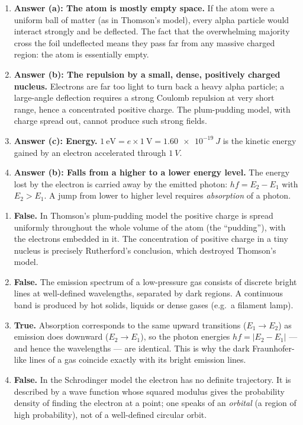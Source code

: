 \documentclass[11pt]{article}
\begin{document}
\begin{corrige}
\begin{enumerate}
\item \textbf{Answer (a): The atom is mostly empty space.} If the atom were a uniform ball of matter (as in Thomson's model), every alpha particle would interact strongly and be deflected. The fact that the overwhelming majority cross the foil undeflected means they pass far from any massive charged region: the atom is essentially empty.
\item \textbf{Answer (b): The repulsion by a small, dense, positively charged nucleus.} Electrons are far too light to turn back a heavy alpha particle; a large-angle deflection requires a strong Coulomb repulsion at very short range, hence a concentrated positive charge. The plum-pudding model, with charge spread out, cannot produce such strong fields.
\item \textbf{Answer (c): Energy.} $1\ \mathrm{eV} = e \times 1\ \mathrm{V} = \SI{1.60e-19}{J}$ is the kinetic energy gained by an electron accelerated through $\SI{1}{V}$.
\item \textbf{Answer (b): Falls from a higher to a lower energy level.} The energy lost by the electron is carried away by the emitted photon: $hf = E_2 - E_1$ with $E_2 > E_1$. A jump from lower to higher level requires \emph{absorption} of a photon.
\end{enumerate}
\end{corrige}

\begin{corrige}
\begin{enumerate}
\item \textbf{False.} In Thomson's plum-pudding model the positive charge is spread uniformly throughout the whole volume of the atom (the ``pudding''), with the electrons embedded in it. The concentration of positive charge in a tiny nucleus is precisely Rutherford's conclusion, which destroyed Thomson's model.
\item \textbf{False.} The emission spectrum of a low-pressure gas consists of discrete bright lines at well-defined wavelengths, separated by dark regions. A continuous band is produced by hot solids, liquids or dense gases (e.g.\ a filament lamp).
\item \textbf{True.} Absorption corresponds to the same upward transitions ($E_1 \to E_2$) as emission does downward ($E_2 \to E_1$), so the photon energies $hf = |E_2 - E_1|$ — and hence the wavelengths — are identical. This is why the dark Fraunhofer-like lines of a gas coincide exactly with its bright emission lines.
\item \textbf{False.} In the Schrodinger model the electron has no definite trajectory. It is described by a wave function whose squared modulus gives the probability density of finding the electron at a point; one speaks of an \emph{orbital} (a region of high probability), not of a well-defined circular orbit.
\end{enumerate}
\end{corrige}
\end{document}
